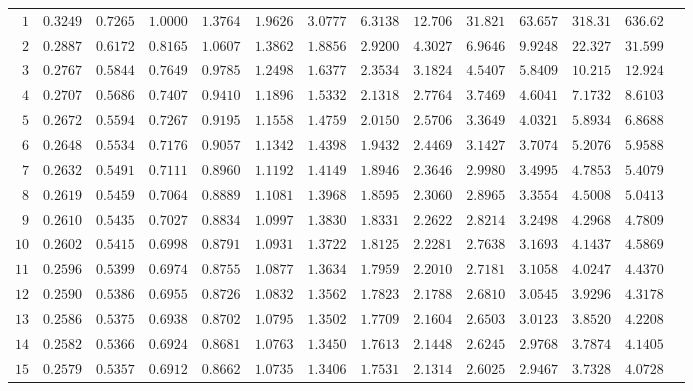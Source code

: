 \begin{center}
\begin{small}
\begin{longtable}[c]{rrrrrrrrrrrrrr}
 $1$ & $0.3249$ & $0.7265$ & $1.0000$ & $1.3764$ & $1.9626$ & $3.0777$ & $6.3138$ & $12.706$ & $31.821$ & $63.657$ & $318.31$ & $636.62$ \\ 
 $2$ & $0.2887$ & $0.6172$ & $0.8165$ & $1.0607$ & $1.3862$ & $1.8856$ & $2.9200$ & $4.3027$ & $6.9646$ & $9.9248$ & $22.327$ & $31.599$ \\ 
 $3$ & $0.2767$ & $0.5844$ & $0.7649$ & $0.9785$ & $1.2498$ & $1.6377$ & $2.3534$ & $3.1824$ & $4.5407$ & $5.8409$ & $10.215$ & $12.924$ \\ 
 $4$ & $0.2707$ & $0.5686$ & $0.7407$ & $0.9410$ & $1.1896$ & $1.5332$ & $2.1318$ & $2.7764$ & $3.7469$ & $4.6041$ & $7.1732$ & $8.6103$ \\ 
 $5$ & $0.2672$ & $0.5594$ & $0.7267$ & $0.9195$ & $1.1558$ & $1.4759$ & $2.0150$ & $2.5706$ & $3.3649$ & $4.0321$ & $5.8934$ & $6.8688$ \\ 
 $6$ & $0.2648$ & $0.5534$ & $0.7176$ & $0.9057$ & $1.1342$ & $1.4398$ & $1.9432$ & $2.4469$ & $3.1427$ & $3.7074$ & $5.2076$ & $5.9588$ \\ 
 $7$ & $0.2632$ & $0.5491$ & $0.7111$ & $0.8960$ & $1.1192$ & $1.4149$ & $1.8946$ & $2.3646$ & $2.9980$ & $3.4995$ & $4.7853$ & $5.4079$ \\ 
 $8$ & $0.2619$ & $0.5459$ & $0.7064$ & $0.8889$ & $1.1081$ & $1.3968$ & $1.8595$ & $2.3060$ & $2.8965$ & $3.3554$ & $4.5008$ & $5.0413$ \\ 
 $9$ & $0.2610$ & $0.5435$ & $0.7027$ & $0.8834$ & $1.0997$ & $1.3830$ & $1.8331$ & $2.2622$ & $2.8214$ & $3.2498$ & $4.2968$ & $4.7809$ \\[4pt] 
 $10$ & $0.2602$ & $0.5415$ & $0.6998$ & $0.8791$ & $1.0931$ & $1.3722$ & $1.8125$ & $2.2281$ & $2.7638$ & $3.1693$ & $4.1437$ & $4.5869$ \\ 
 $11$ & $0.2596$ & $0.5399$ & $0.6974$ & $0.8755$ & $1.0877$ & $1.3634$ & $1.7959$ & $2.2010$ & $2.7181$ & $3.1058$ & $4.0247$ & $4.4370$ \\ 
 $12$ & $0.2590$ & $0.5386$ & $0.6955$ & $0.8726$ & $1.0832$ & $1.3562$ & $1.7823$ & $2.1788$ & $2.6810$ & $3.0545$ & $3.9296$ & $4.3178$ \\ 
 $13$ & $0.2586$ & $0.5375$ & $0.6938$ & $0.8702$ & $1.0795$ & $1.3502$ & $1.7709$ & $2.1604$ & $2.6503$ & $3.0123$ & $3.8520$ & $4.2208$ \\ 
 $14$ & $0.2582$ & $0.5366$ & $0.6924$ & $0.8681$ & $1.0763$ & $1.3450$ & $1.7613$ & $2.1448$ & $2.6245$ & $2.9768$ & $3.7874$ & $4.1405$ \\ 
 $15$ & $0.2579$ & $0.5357$ & $0.6912$ & $0.8662$ & $1.0735$ & $1.3406$ & $1.7531$ & $2.1314$ & $2.6025$ & $2.9467$ & $3.7328$ & $4.0728$ \\ 

\end{longtable}
\end{small}
\end{center}
